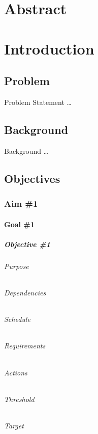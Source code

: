 
\chapter{Abstract}

\chapter{Introduction}

\section{Problem} 
Problem Statement \dots

\section{Background}
Background \dots

\section{Objectives}

\subsection{Aim \#1}

	\subsubsection{Goal \#1}

		\paragraph{Objective \#1}

			\subparagraph{Purpose}

			\subparagraph{Dependencies}

			\subparagraph{Schedule}

			\subparagraph{Requirements}

			\subparagraph{Actions}

			\subparagraph{Threshold}

			\subparagraph{Target}

\closepart

